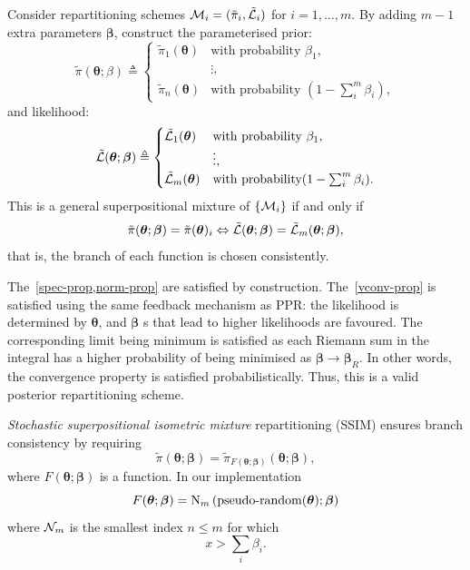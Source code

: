\documentclass[usenatbib]{mnras}
\begin{document}
Consider repartitioning schemes
${\cal M}_{i} = (\tilde{\pi}_{i}, \tilde{\cal L}_{i})$ for
$i=1, \ldots, m$. By adding \(m-1\) extra parameters $\bm{\beta}$,
construct the parameterised prior:
\begin{equation*}
  \tilde{\pi}(\bm{\theta}; \beta)  \triangleq \begin{cases}
	\tilde{\pi}_{1}(\bm{\theta}) & \text{with probability } \beta_{1},\\
	& \vdots,\\
	\tilde{\pi}_{n}(\bm{\theta}) & \text{with probability } (1- \sum_{i}^{m}\beta_{i}),
	\end{cases}
\end{equation*}
and likelihood:
\begin{equation*}
  \tilde{\cal L}(\bm{\theta}; \bm{\beta})  \triangleq
  \begin{cases}
	\tilde{\cal L}_{1}(\bm{\theta}) &  \text{with probability } \beta_{1},\\
		    &\vdots,\\
	\tilde{\cal L}_{m}(\bm{\theta}) & \text{with probability} (1- \sum_{i}^{m}\beta_{i}).
\end{cases}
\end{equation*}
This is a general superpositional mixture of $\{{\cal M}_{i}\}$ if and only if
\begin{equation}
  \label{eq:sspr}
  \tilde{\pi}(\bm{\theta}; \bm{\beta}) = \tilde{\pi}(\bm{\theta})_{i} \Leftrightarrow \tilde{\cal L}(\bm{\theta}; \bm{\beta}) = \tilde{\cal L}_{m}(\bm{\theta}; \bm{\beta}), 
\end{equation}
that is, the branch of each function is chosen consistently.

The~\cref{spec-prop,norm-prop} are satisfied by
construction. The~\cref{vconv-prop} is satisfied using the same
feedback mechanism as PPR: the likelihood is determined by
\(\bm{\theta}\), and \(\bm{\beta}\) s that lead to higher likelihoods are
favoured. The corresponding limit being minimum is satisfied as
each Riemann sum in the integral has a higher probability of being
minimised as \(\bm{\beta}\rightarrow\bm{\beta}_{R}\). In other words, the
convergence property is satisfied probabilistically. Thus, this is
a valid posterior repartitioning scheme.

\emph{Stochastic superpositional isometric mixture} repartitioning
(SSIM) ensures branch consistency by requiring
\begin{equation*}
\tilde{\pi}(\bm{\theta}; \bm{\beta}) = \tilde{\pi}_{F(\bm{\theta};
  \bm{\beta})}(\bm{\theta};\bm{\beta}),
\end{equation*}
where $F(\bm{\theta}; \bm{\beta})$ is a function. In our implementation
\begin{equation*}
  F(\bm{\theta};\bm{\beta})= \text{{\cal N}}_{m}\left(\text{pseudo-random}(\bm{\theta}); \bm{\beta}\right)
\end{equation*}
where \({\cal N}_{m}\) is the smallest index \(n \leq m\) for
which \[x > \sum_{i}\beta_{i}.\]
\end{document}
